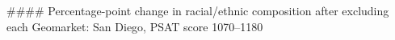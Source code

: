 #### Percentage-point change in racial/ethnic composition after excluding each Geomarket: San Diego, PSAT score 1070–1180
